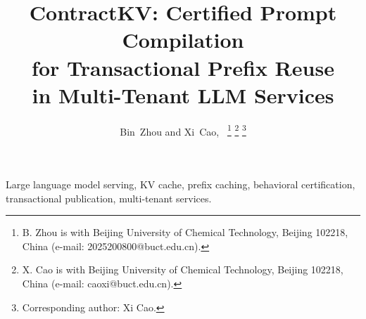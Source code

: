 \documentclass[journal]{IEEEtran}
\begin{document}
\title{ContractKV: Certified Prompt Compilation\\for Transactional Prefix Reuse\\in Multi-Tenant LLM Services}
\author{Bin~Zhou and Xi~Cao,~
\thanks{B. Zhou is with Beijing University of Chemical Technology, Beijing 102218, China (e-mail: 2025200800@buct.edu.cn).}
\thanks{X. Cao is with Beijing University of Chemical Technology, Beijing 102218, China (e-mail: caoxi@buct.edu.cn).}
\thanks{Corresponding author: Xi Cao.}}
\maketitle

\begin{IEEEkeywords}
Large language model serving, KV cache, prefix caching, behavioral certification, transactional publication, multi-tenant services.
\end{IEEEkeywords}











\end{document}
